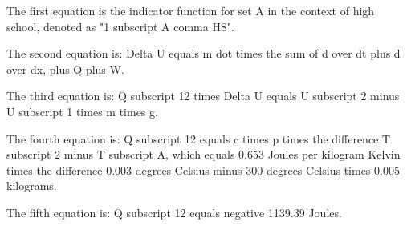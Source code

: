The first equation is the indicator function for set A in the context of high school, denoted as "1 subscript A comma HS".

The second equation is:
Delta U equals m dot times the sum of d over dt plus d over dx, plus Q plus W.

The third equation is:
Q subscript 12 times Delta U equals U subscript 2 minus U subscript 1 times m times g.

The fourth equation is:
Q subscript 12 equals c times p times the difference T subscript 2 minus T subscript A, which equals 0.653 Joules per kilogram Kelvin times the difference 0.003 degrees Celsius minus 300 degrees Celsius times 0.005 kilograms.

The fifth equation is:
Q subscript 12 equals negative 1139.39 Joules.